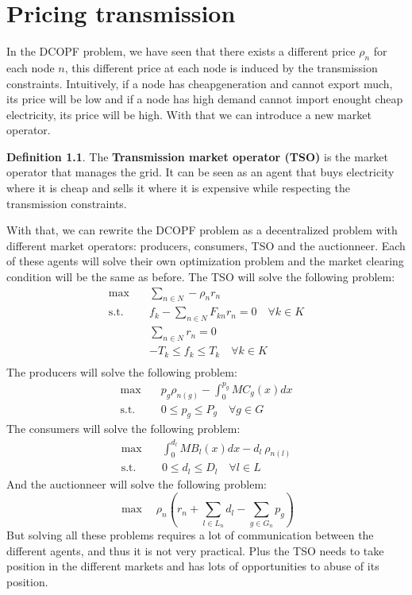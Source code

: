 \documentclass[12pt, openany]{report}
\theoremstyle{definition}
\newtheorem{definition}[thm]{Definition}
\begin{document}
\chapter{Pricing transmission}
In the DCOPF problem, we have seen that there exists a different price $\rho_n$ for each node $n$, this different price at each node is induced by the transmission constraints. Intuitively, if a node has cheapgeneration and cannot export much, its price will be low and if a node has high demand cannot import enought cheap electricity, its price will be high. With that we can introduce a new market operator.
\begin{definition}
    The \textbf{Transmission market operator (TSO)} is the market operator that manages the grid. It can be seen as an agent that buys electricity where it is cheap and sells it where it is expensive while respecting the transmission constraints.
\end{definition}
With that, we can rewrite the DCOPF problem as a decentralized problem with different market operators: producers, consumers, TSO and the auctionneer. Each of these agents will solve their own optimization problem and the market clearing condition will be the same as before. The TSO will solve the following problem:
\begin{equation}
    \begin{aligned}
        \max \quad & \sum_{n \in N} -\rho_n r_n \\
        \text{s.t.} \quad & f_k - \sum_{n \in N} F_{kn} r_n = 0 \quad \forall k \in K \\
        & \sum_{n \in N} r_n = 0 \\
        & -T_k \leq f_k \leq T_k\quad \forall k \in K \\
    \end{aligned}
\end{equation}
The producers will solve the following problem:
\begin{equation}
    \begin{aligned}
        \max \quad & p_g \rho_{n(g)} - \int_{0}^{p_g} MC_g(x)dx \\
        \text{s.t.} \quad & 0 \leq p_g \leq P_g \quad \forall g \in G
    \end{aligned}
\end{equation}
The consumers will solve the following problem:
\begin{equation}
    \begin{aligned}
        \max \quad & \int_{0}^{d_l} MB_l(x)dx -  d_l \ \rho_{n(l)} \\
        \text{s.t.} \quad & 0 \leq d_l \leq D_l \quad \forall l \in L
    \end{aligned}
\end{equation}
And the auctionneer will solve the following problem:
\begin{equation}
    \max \quad \rho_n \left(r_n + \sum_{l \in L_n} d_l - \sum_{g \in G_n} p_g \right)
\end{equation}
But solving all these problems requires a lot of communication between the different agents, and thus it is not very practical. Plus the TSO needs to take position in the different markets and has lots of opportunities to abuse of its position.
\end{document}
